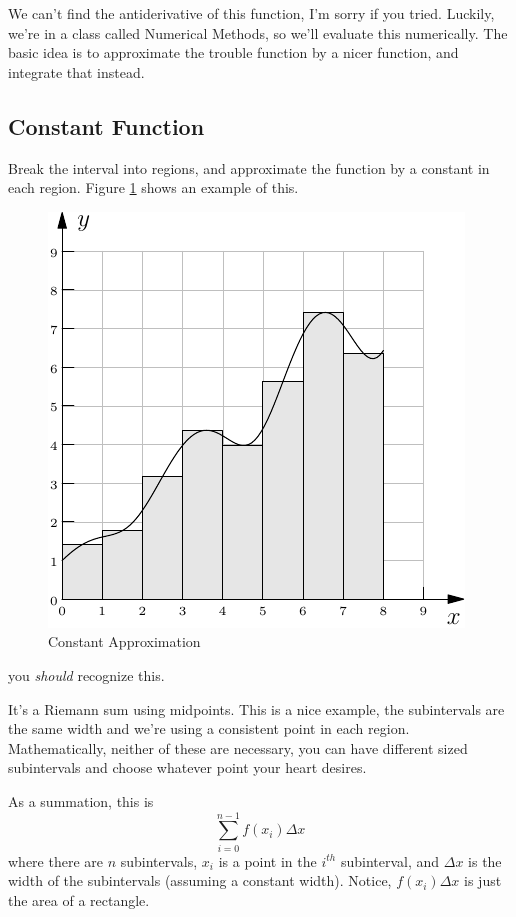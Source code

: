 \documentclass[11pt,letterpaper]{article}
\begin{document}
We can't find the antiderivative of this function, I'm sorry if you tried. Luckily, we're in a 
class called Numerical Methods, so we'll evaluate this numerically. The basic idea is to approximate
the trouble function by a nicer function, and integrate that instead.

\subsection{Constant Function}
Break the interval into regions, and approximate the function by a constant in each region. Figure
\ref{fig:const} shows an example of this.
\begin{figure}[!ht]
 \centering
 \includegraphics{images/fun_constant.pdf}
 \caption{Constant Approximation}
 \label{fig:const}
\end{figure}
you \emph{should} recognize this. 


It's a Riemann sum using midpoints. This is a nice example, the subintervals are the same width
and we're using a consistent point in each region. Mathematically, neither of these are necessary,
you can have different sized subintervals and choose whatever point your heart desires.

As a summation, this is
\[
\sum_{i=0}^{n-1} f(x_i)\Delta x
\]
where there are $n$ subintervals, $x_i$ is a point in the $i^{th}$ subinterval, and $\Delta x$ is
the width of the subintervals (assuming a constant width). Notice, $f(x_i)\Delta x$ is just
the area of a rectangle.
\end{document}
